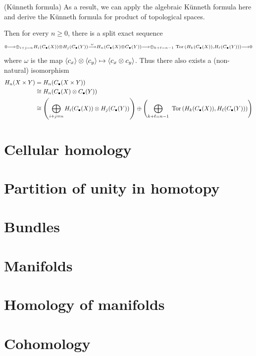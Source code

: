 \documentclass[11pt]{book} %
\begin{document}
\begin{corollary}(K\"unneth formula)
As a result, we can apply the algebraic K\"unneth formula here and derive the K\"unneth formula for product of topological spaces.

Then for every $n\geq 0$, there is a split exact sequence
$$
{\scriptstyle
0\longrightarrow \oplus_{i+j=n}H_i(C_\bullet(X))\otimes H_j(C_\bullet(Y))\overset{\omega}{\longrightarrow} H_n(C_\bullet(X)\otimes C_\bullet(Y))\longrightarrow \oplus_{k+\ell=n-1}\text{ Tor\,}(H_k(C_\bullet(X)),H_\ell(C_\bullet(Y)))\longrightarrow 0}
$$
where $\omega$ is the map $\langle c_x\rangle\otimes \langle c_y\rangle\mapsto \langle c_x\otimes c_y\rangle$. 
Thus there also exists a (non-natural) isomorphism 
$$
\begin{aligned}
H_n(X\times Y)&=H_n(C_\bullet(X\times Y))\\
&\cong H_n(C_\bullet(X)\otimes C_\bullet(Y))\\
&\cong \left(\bigoplus_{i+j=n}H_i(C_\bullet(X))\otimes H_j (C_\bullet(Y))\right)\oplus\left(\bigoplus_{k+\ell=n-1} \text{ Tor\,}(H_k(C_\bullet(X)),H_\ell(C_\bullet(Y)))\right)
\end{aligned}
$$

\end{corollary}
\chapter{Cellular homology}
\chapter{Partition of unity in homotopy}
\chapter{Bundles}

\chapter{Manifolds}

\chapter{Homology of manifolds}

\chapter{Cohomology}
\end{document}
